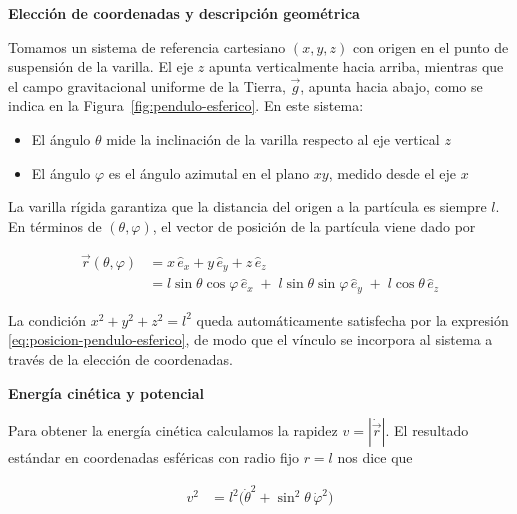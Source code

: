 \documentclass{article}
\begin{document}
\vspace{0.5cm}
\textbf{Elección de coordenadas y descripción geométrica}

Tomamos un sistema de referencia cartesiano \((x,y,z)\) con origen en el punto de
suspensión de la varilla.  
El eje \(z\) apunta verticalmente hacia arriba, mientras que el campo gravitacional
uniforme de la Tierra, \(\vec g\), apunta hacia abajo, como se indica en la
Figura~\ref{fig:pendulo-esferico}.  
En este sistema:

\begin{itemize}
  \item[$\bullet$] El ángulo \(\theta\) mide la inclinación de la varilla respecto al eje vertical \(z\)  
  \item[$\bullet$] El ángulo \(\varphi\) es el ángulo azimutal en el plano \(xy\), medido desde el eje \(x\)
\end{itemize}

La varilla rígida garantiza que la distancia del origen a la partícula es siempre
\(l\).  
En términos de \((\theta,\varphi)\), el vector de posición de la partícula viene dado por

\begin{equation}
\begin{split}
\vec r(\theta,\varphi)
&= x\,\hat e_{x} + y\,\hat e_{y} + z\,\hat e_{z} \\[4pt]
&= l\sin\theta\cos\varphi\,\hat e_{x}
 \;+\; l\sin\theta\sin\varphi\,\hat e_{y}
 \;+\; l\cos\theta\,\hat e_{z}
\end{split}\label{eq:posicion-pendulo-esferico}
\end{equation}

La condición \(x^{2}+y^{2}+z^{2}=l^{2}\) queda automáticamente satisfecha por la
expresión \eqref{eq:posicion-pendulo-esferico}, de modo que el vínculo se incorpora
al sistema a través de la elección de coordenadas.

\vspace{0.5cm}
\textbf{Energía cinética y potencial}

Para obtener la energía cinética calculamos la rapidez \(v = |\dot{\vec r}|\).  
El resultado estándar en coordenadas esféricas con radio fijo \(r=l\) nos dice que

\begin{equation}
\begin{split}
v^{2} &= l^{2}\bigl(\dot\theta^{2} + \sin^{2}\theta\,\dot\varphi^{2}\bigr)
\end{split}\label{eq:rapidez-pendulo-esferico}
\end{equation}
\end{document}
